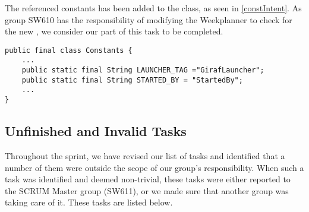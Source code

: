 The referenced constants has been added to the  class, as seen
in \autoref{constIntent}. As group SW610 has the responsibility of
modifying the Weekplanner to check for the new , we consider our
part of this task to be completed.\nl

\begin{minipage}[H]{\linewidth}
\begin{lstlisting}[caption = Constants containing the strings for the Launchers's \textc{Intent}., label = constIntent] 
public final class Constants {
	...
	public static final String LAUNCHER_TAG ="GirafLauncher";
	public static final String STARTED_BY = "StartedBy";
	...
}
\end{lstlisting}
\end{minipage}

\subsection{Unfinished and Invalid Tasks}
Throughout the sprint, we have revised our list of tasks and identified
that a number of them were outside the scope of our group's responsibility.
When such a task was identified and deemed non-trivial, these tasks were either
reported to the SCRUM Master group (SW611), or we made sure that another group
was taking care of it. These tasks are listed below.


